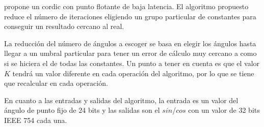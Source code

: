\cite{nguyen_low-resource_2015} propone un \gls{cordic} con punto flotante de baja latencia. El algoritmo propuesto reduce el número de iteraciones eligiendo un grupo particular de constantes para conseguir un resultado cercano al real.

La reducción del número de ángulos a escoger se basa en elegir los ángulos hasta llegar a un umbral particular para tener un error de cálculo muy cercano a como si se hiciera el de todas las constantes. Un punto a tener en cuenta es que el valor $K$ tendrá un valor diferente en cada operación del algoritmo, por lo que se tiene que recalcular en cada operación.

En cuanto a las entradas y salidas del algoritmo, la entrada es un valor del ángulo de punto fijo de 24 bits y las salidas son el $sin$/$cos$ con un valor de 32 bits IEEE 754 cada una.

\begin{table}[]
	\centering
	\caption{Tabla de comparaciones del \gls{cordic} propuesto con otros trabajos parecidos. Tabla de \cite{nguyen_low-resource_2015}}
\label{graf:2015_low-latency-fp}
\end{table}



